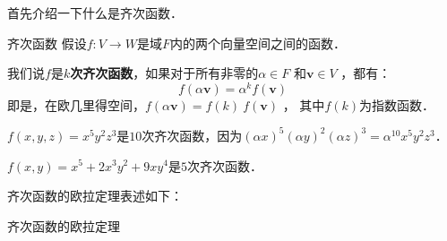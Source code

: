 
首先介绍一下什么是齐次函数．

\begin{definition}{齐次函数}
假设$f: V \to W $是域$ F $内的两个向量空间之间的函数．

我们说$f$是$k$\textbf{次齐次函数}，如果对于所有非零的$\alpha \in F$ 和$\mathbf{v} \in V$ ，都有：
\begin{equation}
f(\alpha \mathbf{v}) = \alpha^k f(\mathbf{v}) 
\end{equation}
即是，在欧几里得空间，$f(\alpha \mathbf{v}) = f(k) \ f(\mathbf{v})$ ， 其中$f(k)$为指数函数．
\end{definition}

\begin{example}{}
$f(x,y,z)=x^5y^2z^3$是$10$次齐次函数，因为$(\alpha x)^5(\alpha y)^2(\alpha z)^3=\alpha^{10}x^5y^2z^3$．

$f(x,y)=x^5 + 2 x^3 y^2 + 9 x y^4$是$5$次齐次函数．
\end{example}

齐次函数的欧拉定理表述如下：

\begin{theorem}{齐次函数的欧拉定理}

\end{theorem}